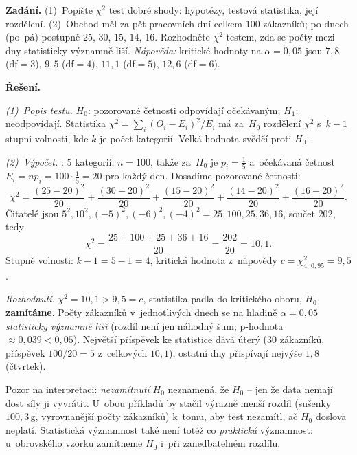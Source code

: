 \begin{priklad}
\par
\textbf{Zadání.} (1)~Popište $\chi^2$ test dobré shody: hypotézy, testová statistika, její rozdělení. (2)~Obchod měl za pět pracovních dní celkem $100$ zákazníků; po dnech (po--pá) postupně $25$, $30$, $15$, $14$, $16$. Rozhodněte $\chi^2$ testem, zda se počty mezi dny statisticky významně liší. \textit{Nápověda:} kritické hodnoty na $\alpha=0{,}05$ jsou $7{,}8$ (df${}=3$), $9{,}5$ (df${}=4$), $11{,}1$ (df${}=5$), $12{,}6$ (df${}=6$).

\smallskip
\textbf{Řešení.}

\emph{(1)~Popis testu.} $H_0$: pozorované četnosti odpovídají očekávaným; $H_1$: neodpovídají. Statistika $\chi^2=\sum_i (O_i-E_i)^2/E_i$ má za~$H_0$ rozdělení $\chi^2$ s~$k-1$ stupni volnosti, kde $k$ je počet kategorií. Velká hodnota svědčí proti $H_0$.

\emph{(2)~Výpočet.} : $5$ kategorií, $n=100$, takže za~$H_0$ je $p_i=\tfrac15$ a~očekávaná četnost $E_i=n p_i=100\cdot\tfrac15=20$ pro každý den. Dosadíme pozorované četnosti:
\[ \chi^2=\frac{(25-20)^2}{20}+\frac{(30-20)^2}{20}+\frac{(15-20)^2}{20}+\frac{(14-20)^2}{20}+\frac{(16-20)^2}{20}. \]
Čitatelé jsou $5^2,10^2,(-5)^2,(-6)^2,(-4)^2=25,100,25,36,16$, součet $202$, tedy
\[ \chi^2=\frac{25+100+25+36+16}{20}=\frac{202}{20}=\boxed{10{,}1}. \]
Stupně volnosti: $k-1=5-1=4$, kritická hodnota z~nápovědy $c=\chi^2_{4,\,0{,}95}=9{,}5$.

\emph{Rozhodnutí.} $\chi^2=10{,}1>9{,}5=c$, statistika padla do kritického oboru, \textbf{$H_0$ zamítáme}. Počty zákazníků v~jednotlivých dnech se na hladině $\alpha=0{,}05$ \emph{statisticky významně liší} (rozdíl není jen náhodný šum; p-hodnota $\approx 0{,}039<0{,}05$). Největší příspěvek ke statistice dává úterý ($30$ zákazníků, příspěvek $100/20=5$ z~celkových $10{,}1$), ostatní dny přispívají nejvýše $1{,}8$ (čtvrtek).
\end{priklad}

\begin{poznamka}
Pozor na interpretaci: \emph{nezamítnutí} $H_0$ neznamená, že $H_0$  -- jen že data nemají dost síly ji vyvrátit. U~obou příkladů by stačil výrazně menší rozdíl (sušenky $100{,}3\,$g, vyrovnanější počty zákazníků) k~tomu, aby test nezamítl, ač $H_0$ doslova neplatí. Statistická významnost také není totéž co \emph{praktická} významnost: u~obrovského vzorku zamítneme $H_0$ i~při zanedbatelném rozdílu.
\end{poznamka}
